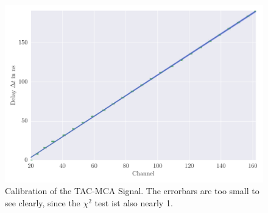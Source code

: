 \label{sub:calibration_of_tac_mca_signal}
\begin{figure}[htpb]
    \centering
    \includegraphics[width=1.0\linewidth]{analysis/figures/plot7}
    \caption{Calibration of the TAC-MCA Signal. The errorbars are too small
        to see clearly, since the $\chi^2$ test ist also nearly 1.}
    \label{fig:plot7}
\end{figure}



\label{sub:measuring_delayed_coincidences}
